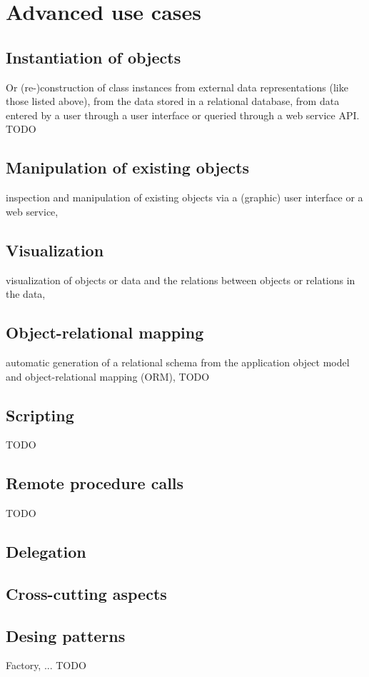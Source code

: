 \section{Advanced use cases}


\subsection{Instantiation of objects}

Or (re-)construction of class instances
from external data representations (like those listed above),
from the data stored in a relational database, from data entered by
a user through a user interface or queried through a web service API.
TODO

\subsection{Manipulation of existing objects}
inspection and manipulation of existing objects via a (graphic) user interface
or a web service,

\subsection{Visualization}
visualization of objects or data and the relations between objects or
relations in the data,

\subsection{Object-relational mapping}

automatic generation of a relational schema from the application
object model and object-relational mapping (ORM),
TODO

\subsection{Scripting}

TODO

\subsection{Remote procedure calls}

TODO

\subsection{Delegation}

\subsection{Cross-cutting aspects}

\subsection{Desing patterns}

Factory, ...
TODO

